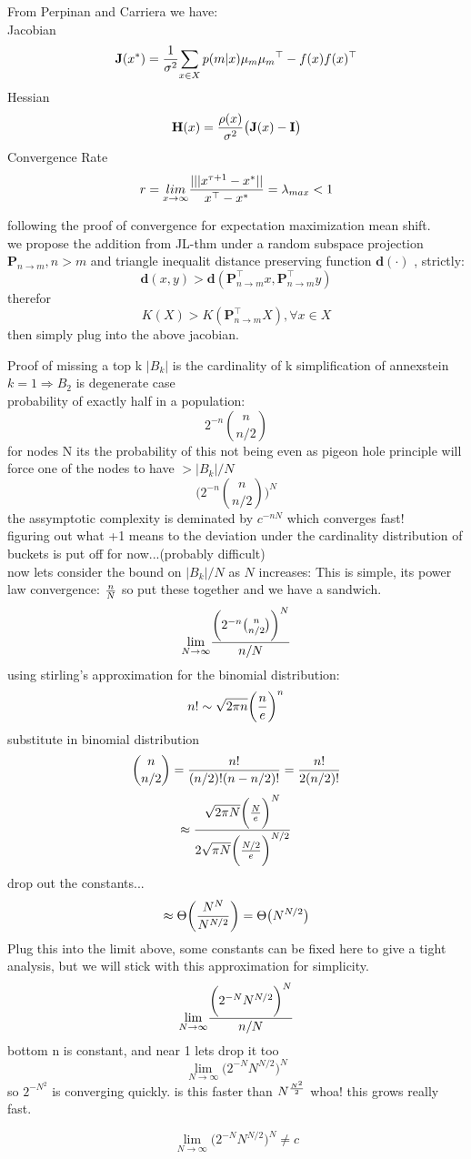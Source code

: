 \documentclass[a4paper,10pt]{article}
\begin{document}
From Perpinan and Carriera we have:\\
Jacobian
$$
\textbf{J}(x^*) = {{1}\over{\sigma^2}}{\sum_{x\in X}{p(m | x)\mu_m{\mu_m}^\top - f(x)f(x)^\top}}
$$
Hessian
$$
\textbf{H}(x)={{\rho(x)}\over{\sigma^2}}\big(\textbf{J}(x)-\textbf{I}\big)
$$
Convergence Rate
$$
r = \underset{x\to\infty}{lim} {{|||x^{\tau+1}-x^*||}\over{x^\top - x^*}} = \lambda_{max} < 1
$$

following the proof of convergence for expectation maximization mean shift.\\
we propose the addition from JL-thm under a random subspace projection $\textbf{P}_{n\to m}, n>m$ 
and triangle inequalit distance preserving function $\textbf{d}(\cdot)$ , strictly:
$$
\textbf{d}(x,y)>\textbf{d}(\textbf{P}_{n\to m}^\top x,\textbf{P}_{n\to m}^\top y)
$$
therefor
$$
K(X)>K(\textbf{P}_{n\to m}^\top X), \forall x \in X
$$
then simply plug into the above jacobian.


Proof of missing a top k
$|B_k|$ is the cardinality of k
simplification of annexstein
$k = 1 \Rightarrow B_2$ is degenerate case\\
probability of exactly half in a population:
$${2}^{-n}\binom{n}{n/2}$$ 
for nodes N its the probability of this not being even
as pigeon hole principle will force one of the nodes to have $> |B_k|/N$
$$\bigg({2}^{-n}\binom{n}{n/2}\bigg)^N$$
the assymptotic complexity is deminated by $c^{-nN}$ which converges fast!\\
figuring out what +1 means to the deviation under the cardinality distribution of
buckets is put off for now...(probably difficult)\\
now lets consider the bound on $|B_k|/N$ as $N$ increases:
This is simple, its power law convergence: $n \over N$
so put these together and we have a sandwich.
$$\underset{N\rightarrow\infty}\lim{ {{\bigg({2}^{-n}\binom{n}{n/2}\bigg)^N} \over {n/N}}}$$
using stirling's approximation for the binomial distribution:\\
$$
n! \sim \sqrt{2\pi n}\bigg({n\over e}\bigg)^n
$$
substitute in binomial distribution
$$\binom{n}{n/2} = {{n!}\over{(n/2)!(n-n/2)!}} = {{n!}\over{2(n/2)!}} $$
$$
\approx{{\sqrt{2\pi N}\bigg({N\over e}\bigg)^N} \over{ 2\sqrt{\pi N}\bigg({{N/2}\over e}\bigg)^{N/2} }}
$$
drop out the constants...
$$\approx \Theta \bigg({ {N^{N} }\over {N^{N/2}} }\bigg) = \Theta \big({N^{N/2} }\big)$$
Plug this into the limit above, some constants can be fixed here to give a tight analysis, but we will stick with this approximation for
simplicity. 
$$\underset{N\rightarrow\infty}\lim
{{\bigg({2}^{-N}{N^{N/2}}\bigg)^{N }} \over {n/N}}
$$
bottom n is constant, and near 1 lets drop it too
$$\underset{N\rightarrow\infty}\lim
{\bigg({2}^{-N}{N^{N/2}}\bigg)^{N }}
$$
so $2^{ -N^2}$ is converging quickly.
is this faster than $N^{{N^2}\over{2}}$
whoa! this grows really fast.

$$\underset{N\rightarrow\infty}\lim
{\bigg({2}^{-N}{N^{N/2}}\bigg)^{N }}\neq c
$$
\end{document}
